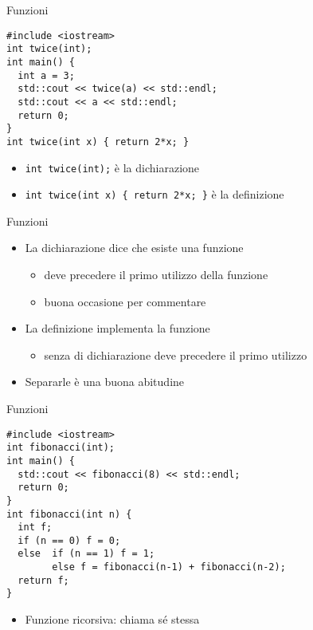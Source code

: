\begin{frame}[fragile]{Funzioni}
  \vfill
  \begin{lstlisting}
#include <iostream>
int twice(int);
int main() {
  int a = 3;
  std::cout << twice(a) << std::endl;
  std::cout << a << std::endl;
  return 0;
}
int twice(int x) { return 2*x; }
  \end{lstlisting}
  \vfill
  \begin{itemize}
    \item \lstinline$int twice(int);$ è la \alert{dichiarazione}
    \vfill
    \item \lstinline$int twice(int x) { return 2*x; }$ è la \alert{definizione}
  \end{itemize}
  \vfill
\end{frame}

\begin{frame}[fragile]{Funzioni}
  \vfill
  \begin{itemize}
    \item La dichiarazione dice che esiste una funzione
    \begin{itemize}
      \item deve precedere il primo utilizzo della funzione
      \item buona occasione per commentare
    \end{itemize}
    \vfill
    \item La definizione implementa la funzione
    \begin{itemize}
      \item senza di dichiarazione deve precedere il primo utilizzo
    \end{itemize}
    \vfill
    \item Separarle è una buona abitudine
  \end{itemize}
  \vfill
\end{frame}

\begin{frame}[fragile]{Funzioni}
  \vfill
  \begin{lstlisting}
#include <iostream>
int fibonacci(int);
int main() {
  std::cout << fibonacci(8) << std::endl;
  return 0;
}
int fibonacci(int n) {
  int f;
  if (n == 0) f = 0;
  else  if (n == 1) f = 1;
        else f = fibonacci(n-1) + fibonacci(n-2);
  return f;
}
  \end{lstlisting}
  \vfill
  \begin{itemize}
    \item Funzione \alert{ricorsiva}: chiama sé stessa
  \end{itemize}
  \vfill
\end{frame}


